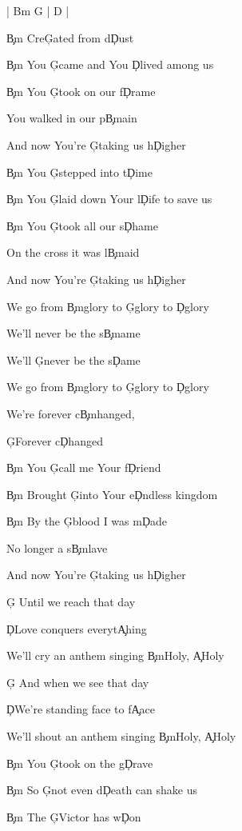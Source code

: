 \documentclass[9pt]{extarticle}
\begin{document}
\bsong

\bi[2]
| Bm G | D |
\ei

\bv
\c{Bm} Cre\c{G}ated from d\c{D}ust

\c{Bm} You \c{G}came and You \c{D}lived among us

\c{Bm} You \c{G}took on our f\c{D}rame

You walked in our p\c{Bm}ain

And now You’re \c{G}taking us h\c{D}igher
\ev

\bv
\c{Bm} You \c{G}stepped into t\c{D}ime

\c{Bm} You \c{G}laid down Your l\c{D}ife to save us

\c{Bm} You \c{G}took all our s\c{D}hame

On the cross it was l\c{Bm}aid

And now You’re \c{G}taking us h\c{D}igher
\ev

\bc
We go from \c{Bm}glory to \c{G}glory to \c{D}glory

We’ll never be the s\c{Bm}ame

We’ll \c{G}never be the s\c{D}ame

We go from \c{Bm}glory to \c{G}glory to \c{D}glory

We’re forever c\c{Bm}hanged,

\c{G}Forever c\c{D}hanged
\ec

\bv
\c{Bm} You \c{G}call me Your f\c{D}riend

\c{Bm} Brought \c{G}into Your e\c{D}ndless kingdom

\c{Bm} By the \c{G}blood I was m\c{D}ade

No longer a s\c{Bm}lave

And now You’re \c{G}taking us h\c{D}igher
\ev


\bb[2]
\c{G} Until we reach that day

\c{D}Love conquers everyt\c{A}hing

We’ll cry an anthem singing \c{Bm}Holy, \c{A}Holy

\c{G} And when we see that day

\c{D}We’re standing face to f\c{A}ace

We’ll shout an anthem singing \c{Bm}Holy, \c{A}Holy
\eb

\bv
\c{Bm} You \c{G}took on the g\c{D}rave

\c{Bm} So \c{G}not even d\c{D}eath can shake us

\c{Bm} The \c{G}Victor has w\c{D}on
\end{document}
